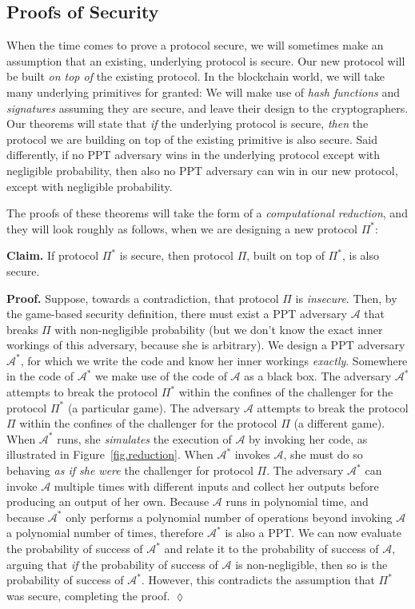 \subsection*{Proofs of Security}

When the time comes to prove a protocol secure, we will sometimes make an assumption
that an existing, underlying protocol is secure. Our new protocol will be built
\emph{on top of} the existing protocol. In the blockchain world, we will take many
underlying primitives for granted: We will make use of \emph{hash functions}
and \emph{signatures} assuming they are secure, and leave their design to the
cryptographers. Our theorems will state that \emph{if} the underlying protocol is
secure, \emph{then} the protocol we are building on top of the existing primitive
is also secure. Said differently, if no PPT adversary wins in the underlying protocol
except with negligible probability, then also no PPT adversary can win in our new
protocol, except with negligible probability.

The proofs of these theorems will take the form of a \emph{computational reduction},
and they will look roughly as follows, when we are designing a new protocol $\Pi^*$:

\noindent
\textbf{Claim. } If protocol $\Pi^*$ is secure, then protocol $\Pi$, built on top of $\Pi^*$,
is also secure.

\noindent
\textbf{Proof. } Suppose, towards a contradiction, that protocol $\Pi$ is \emph{insecure}.
Then, by the game-based security definition, there must exist a PPT adversary $\mathcal{A}$
that breaks $\Pi$ with non-negligible probability (but we don't know the exact inner workings
of this adversary, because she is arbitrary).
We design a PPT adversary $\mathcal{A}^*$, for which we write the code
and know her inner workings \emph{exactly}. Somewhere in the code of $\mathcal{A}^*$ we make
use of the code of $\mathcal{A}$ as a black box. The adversary $\mathcal{A}^*$ attempts
to break the protocol $\Pi^*$ within the confines of the challenger for the protocol $\Pi^*$
(a particular game).
The adversary $\mathcal{A}$ attempts to break the protocol $\Pi$ within the confines of
the challenger for the protocol $\Pi$ (a different game).
When $\mathcal{A}^*$ runs, she \emph{simulates}
the execution of $\mathcal{A}$ by invoking her code, as illustrated in
Figure~\ref{fig.reduction}. When $\mathcal{A}^*$ invokes
$\mathcal{A}$, she must do so behaving \emph{as if she were} the challenger for protocol
$\Pi$. The adversary $\mathcal{A}^*$ can invoke $\mathcal{A}$ multiple times with
different inputs and collect her outputs before producing an output of her own.
Because $\mathcal{A}$ runs in polynomial time, and because $\mathcal{A}^*$ only
performs a polynomial number of operations beyond invoking $\mathcal{A}$ a polynomial
number of times, therefore $\mathcal{A}^*$ is also a PPT. We can now evaluate the
probability of success of $\mathcal{A}^*$ and relate it to the probability of success
of $\mathcal{A}$, arguing that \emph{if} the probability of success of $\mathcal{A}$
is non-negligible, then so is the probability of success of $\mathcal{A}^*$. However,
this contradicts the assumption that $\Pi^*$ was secure, completing the proof. $\lozenge$

